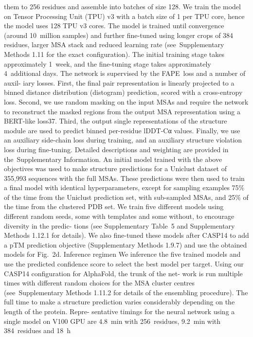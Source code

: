 them to 256 residues and assemble into batches of size 128. We train the
model on Tensor Processing Unit (TPU) v3 with a batch size of 1 per TPU
core, hence the model uses 128 TPU v3 cores. The model is trained until
convergence (around 10 million samples) and further fine-tuned using
longer crops of 384 residues, larger MSA stack and reduced learning
rate (see Supplementary Methods 1.11 for the exact configuration). The
initial training stage takes approximately 1 week, and the fine-tuning
stage takes approximately 4 additional days.
The network is supervised by the FAPE loss and a number of auxil-
iary losses. First, the final pair representation is linearly projected to
a binned distance distribution (distogram) prediction, scored with
a cross-entropy loss. Second, we use random masking on the input
MSAs and require the network to reconstruct the masked regions
from the output MSA representation using a BERT-like loss37. Third,
the output single representations of the structure module are used to
predict binned per-residue lDDT-Cα values. Finally, we use an auxiliary
side-chain loss during training, and an auxiliary structure violation loss
during fine-tuning. Detailed descriptions and weighting are provided
in the Supplementary Information.
An initial model trained with the above objectives was used to make
structure predictions for a Uniclust dataset of 355,993 sequences with
the full MSAs. These predictions were then used to train a final model
with identical hyperparameters, except for sampling examples 75\% of
the time from the Uniclust prediction set, with sub-sampled MSAs, and
25\% of the time from the clustered PDB set.
We train five different models using different random seeds, some
with templates and some without, to encourage diversity in the predic-
tions (see Supplementary Table 5 and Supplementary Methods 1.12.1
for details). We also fine-tuned these models after CASP14 to add a
pTM prediction objective (Supplementary Methods 1.9.7) and use the
obtained models for Fig. 2d.
Inference regimen
We inference the five trained models and use the predicted confidence
score to select the best model per target.
Using our CASP14 configuration for AlphaFold, the trunk of the net-
work is run multiple times with different random choices for the MSA
cluster centres (see Supplementary Methods 1.11.2 for details of the
ensembling procedure). The full time to make a structure prediction
varies considerably depending on the length of the protein. Repre-
sentative timings for the neural network using a single model on V100
GPU are 4.8 min with 256 residues, 9.2 min with 384 residues and 18 h
